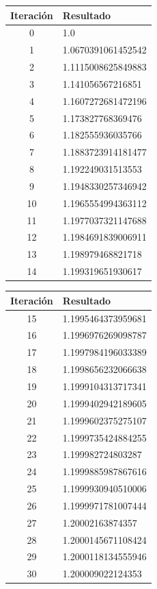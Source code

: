 \documentclass[titlepage,a4paper]{article}
\begin{document}
\begin{multicols}{2}
\begin{center}
    \begin{tabular}{| c | l |}
    \hline
     Iteración & Resultado \\ \hline
     0     &  1.0 \\
1     &  1.0670391061452542 \\
2     &  1.1115008625849883 \\
3     &  1.141056567216851 \\
4     &  1.1607272681472196 \\
5     &  1.173827768369476 \\
6     &  1.182555936035766 \\
7     &  1.1883723914181477 \\
8     &  1.192249031513553 \\
9     &  1.1948330257346942 \\
10     &  1.1965554994363112 \\
11     &  1.1977037321147688 \\
12     &  1.1984691839006911 \\
13     &  1.198979468821718 \\
14     &  1.199319651930617 \\

          \hline
    \end{tabular}
\end{center}
        
    \begin{center}
    \begin{tabular}{| c | l |}
    \hline    
     Iteración & Resultado \\ \hline
   15     &  1.1995464373959681 \\
16     &  1.1996976269098787 \\
17     &  1.1997984196033389 \\
18     &  1.1998656232066638 \\
19     &  1.1999104313717341 \\
20     &  1.1999402942189605 \\
21     &  1.1999602375275107 \\
22     &  1.1999735424884255 \\
23     &  1.199982724803287 \\
24     &  1.1999885987867616 \\
25     &  1.1999930940510006 \\
26     &  1.1999971781007444 \\
27     &  1.20002163874357 \\
28     &  1.2000145671108424 \\
29     &  1.2000118134555946 \\
30     &  1.200009022124353 \\
    \hline
    \end{tabular}
\end{center}
\end{multicols}
\end{document}
